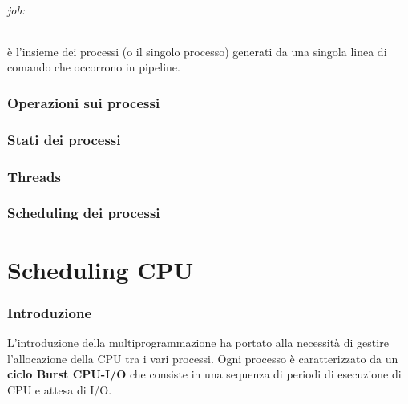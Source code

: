 \documentclass{article}
\begin{document}
\paragraph{job:} è l'insieme dei processi (o il singolo processo) generati da una singola linea di comando che occorrono in pipeline.
\section{Operazioni sui processi}
\section{Stati dei processi}
\section{Threads}
\section{Scheduling dei processi}







\part{Scheduling CPU} %
\section{Introduzione}
L'introduzione della multiprogrammazione ha portato alla necessità di gestire l'allocazione della CPU tra i vari processi.
Ogni processo è caratterizzato da un \textbf{ciclo Burst CPU-I/O} che consiste in una sequenza di periodi
di esecuzione di CPU e attesa di I/O.
\end{document}
